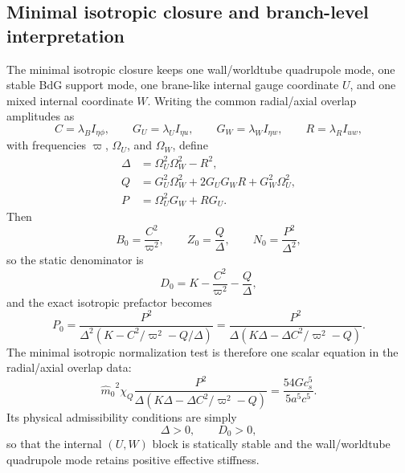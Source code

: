 \documentclass[11pt]{article}
\theoremstyle{definition}
\newcommand{\mhat}{\ensuremath{\hat m_0}}
\begin{document}
\subsection{Minimal isotropic closure and branch-level interpretation}

The minimal isotropic closure keeps one wall/worldtube quadrupole mode, one stable BdG support mode, one brane-like internal gauge coordinate $U$, and one mixed internal coordinate $W$. Writing the common radial/axial overlap amplitudes as
\begin{equation}
C=\lambda_B I_{\eta\phi},
\qquad
G_U=\lambda_U I_{\eta u},
\qquad
G_W=\lambda_W I_{\eta w},
\qquad
R=\lambda_R I_{uw},
\label{eq:outgoing-minimal-overlaps}
\end{equation}
with frequencies $\varpi$, $\Omega_U$, and $\Omega_W$, define
\begin{equation}
\begin{aligned}
\Delta&=\Omega_U^2\Omega_W^2-R^2,
\\
Q&=G_U^2\Omega_W^2+2G_UG_WR+G_W^2\Omega_U^2,
\\
P&=\Omega_U^2G_W+RG_U.
\end{aligned}
\label{eq:outgoing-minimal-DeltaQP}
\end{equation}
Then
\begin{equation}
B_0=\frac{C^2}{\varpi^2},
\qquad
Z_0=\frac{Q}{\Delta},
\qquad
N_0=\frac{P^2}{\Delta^2},
\label{eq:outgoing-minimal-BZN}
\end{equation}
so the static denominator is
\begin{equation}
D_0=K-\frac{C^2}{\varpi^2}-\frac{Q}{\Delta},
\label{eq:outgoing-minimal-D0}
\end{equation}
and the exact isotropic prefactor becomes
\begin{equation}
P_0=\frac{P^2}{\Delta^2\left(K-C^2/\varpi^2-Q/\Delta\right)}
=
\frac{P^2}{\Delta\left(K\Delta-\Delta C^2/\varpi^2-Q\right)}.
\label{eq:outgoing-minimal-P0}
\end{equation}
The minimal isotropic normalization test is therefore one scalar equation in the radial/axial overlap data:
\begin{equation}
\mhat^{2}\chi_Q
\frac{P^2}{\Delta\left(K\Delta-\Delta C^2/\varpi^2-Q\right)}
=
\frac{54Gc_s^5}{5a^5c^5}.
\label{eq:outgoing-minimal-normalization}
\end{equation}
Its physical admissibility conditions are simply
\begin{equation}
\Delta>0,
\qquad
D_0>0,
\label{eq:outgoing-minimal-stability}
\end{equation}
so that the internal $(U,W)$ block is statically stable and the wall/worldtube quadrupole mode retains positive effective stiffness.
\end{document}
